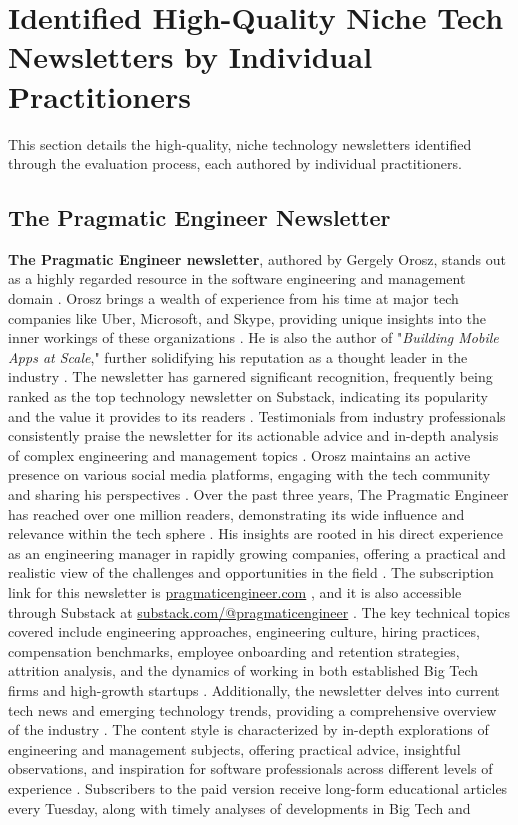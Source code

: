\documentclass[11pt]{article}
\begin{document}
\section{Identified High-Quality Niche Tech Newsletters by Individual Practitioners}
This section details the high-quality, niche technology newsletters identified through the evaluation process, each authored by individual practitioners.

\subsection{The Pragmatic Engineer Newsletter}
\textbf{The Pragmatic Engineer newsletter}, authored by Gergely Orosz, stands out as a highly regarded resource in the software engineering and management domain \citep{orosz2025jellypod}. Orosz brings a wealth of experience from his time at major tech companies like Uber, Microsoft, and Skype, providing unique insights into the inner workings of these organizations \citep{favikon2025orosz}. He is also the author of "\textit{Building Mobile Apps at Scale}," further solidifying his reputation as a thought leader in the industry \citep{favikon2025orosz}. The newsletter has garnered significant recognition, frequently being ranked as the top technology newsletter on Substack, indicating its popularity and the value it provides to its readers \citep{ctoclub2025swe}. Testimonials from industry professionals consistently praise the newsletter for its actionable advice and in-depth analysis of complex engineering and management topics \citep{shoutout2025orosz}. Orosz maintains an active presence on various social media platforms, engaging with the tech community and sharing his perspectives \citep{favikon2025orosz}. Over the past three years, The Pragmatic Engineer has reached over one million readers, demonstrating its wide influence and relevance within the tech sphere \citep{orosz2025bloggingfordevs}. His insights are rooted in his direct experience as an engineering manager in rapidly growing companies, offering a practical and realistic view of the challenges and opportunities in the field \citep{orosz2025bloggingfordevs}. The subscription link for this newsletter is \url{pragmaticengineer.com} \citep{orosz2025pragmaticwebsite}, and it is also accessible through Substack at \url{substack.com/@pragmaticengineer} \citep{orosz2025substack}. The key technical topics covered include engineering approaches, engineering culture, hiring practices, compensation benchmarks, employee onboarding and retention strategies, attrition analysis, and the dynamics of working in both established Big Tech firms and high-growth startups \citep{ctoclub2025swe}. Additionally, the newsletter delves into current tech news and emerging technology trends, providing a comprehensive overview of the industry \citep{ctoclub2025swe}. The content style is characterized by in-depth explorations of engineering and management subjects, offering practical advice, insightful observations, and inspiration for software professionals across different levels of experience \citep{ctoclub2025swe}. Subscribers to the paid version receive long-form educational articles every Tuesday, along with timely analyses of developments in Big Tech and 
\end{document}
